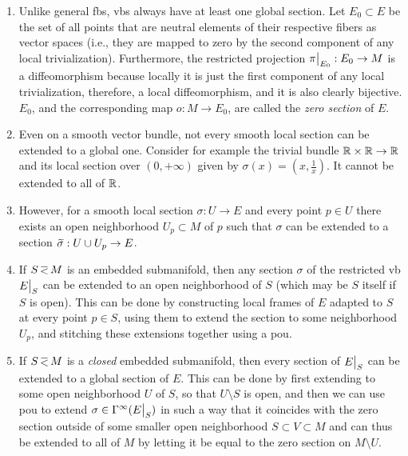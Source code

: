 \begin{rem}\label{rem zero section, extending section}
\begin{enumerate}
    \item Unlike general \glspl{fb}, \glspl{vb} always have at least one global section. Let $E_0\subset E$ be the set of all points that are neutral elements of their respective fibers as vector spaces (i.e., they are mapped to zero by the second component of any local trivialization). Furthermore, the restricted projection $\restr{\pi}{E_0}:E_0\to M$ is a diffeomorphism because locally it is just the first component of any local trivialization, therefore, a local diffeomorphism, and it is also clearly bijective. $E_0$, and the corresponding map $o:M\to E_0$, are called the \emph{zero section} of $E$.
    \item Even on a smooth vector bundle, not every smooth local section can be extended to a global one. Consider for example the trivial bundle $\mathbb{R}\times\mathbb{R}\to \mathbb{R}$ and its local section over $(0,+\infty)$ given by $\sigma(x)=(x,\frac 1x)$. It cannot be extended to all of $\mathbb{R}$. 
    \item However, for a smooth local section $\sigma:U\to E$ and every point $p\in U$ there exists an open neighborhood $U_p\subset M$ of $p$ such that $\sigma$ can be extended to a section $\wt{\sigma}:U\cup U_p\to E$.
    \item If $S\emb M$ is an embedded submanifold, then any section $\sigma$ of the restricted \gls{vb} $\restr{E}{S}$ can be extended to an open neighborhood of $S$ (which may be $S$ itself if $S$ is open). This can be done by constructing local frames of $E$ adapted to $S$ at every point $p\in S$, using them to extend the section to some neighborhood $U_p$, and stitching these extensions together using a \gls{pou}.
    \item If $S\emb M$ is a \emph{closed} embedded submanifold, then every section of $\restr{E}{S}$ can be extended to a global section of $E$. This can be done by first extending to some open neighborhood $U$ of $S$, so that $U\setminus S$ is open, and then we can use \gls{pou} to extend $\sigma\in\Gamma^\infty(\restr{E}{S})$ in such a way that it coincides with the zero section outside of some smaller open neighborhood $S\subset V\subset M$ and can thus be extended to all of $M$ by letting it be equal to the zero section on $M\setminus U$.
\end{enumerate}
\end{rem}


